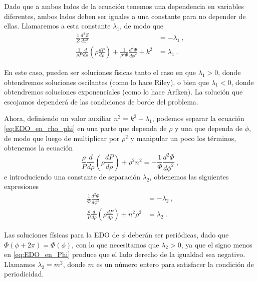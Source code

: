 Dado que a ambos lados de la ecuación tenemos una dependencia en variables diferentes, ambos lados deben ser iguales a una constante para no depender de ellas. Llamaremos a esta constante $\lambda_1$, de modo que
\begin{align}
    \frac{1}{Z} \frac{d^2Z}{dz^2} & = - \lambda_1 \ , \\
    \frac{1}{\rho P} \frac{d}{d\rho} \left( \rho \frac{dP}{d\rho} \right) + \frac{1}{\rho^2 \Phi} \frac{d^2 \Phi}{d\phi^2} + k^2 & = \lambda_1 \ . \label{eq:EDO_en_rho_phi}
\end{align}

En este caso, pueden ser soluciones físicas tanto el caso en que $\lambda_1>0$, donde obtendremos soluciones oscilantes (como lo hace Riley), o bien que $\lambda_1 < 0$, donde obtendremos soluciones exponenciales (como lo hace Arfken). La solución que escojamos dependerá de las condiciones de borde del problema.


Ahora, definiendo un valor auxiliar $n^2 = k^2 + \lambda_1$, podemos separar la ecuación \eqref{eq:EDO_en_rho_phi} en una parte que dependa de $\rho$ y una que dependa de $\phi$, de modo que luego de multiplicar por $\rho^2$ y manipular un poco los términos, obtenemos la ecuación
\begin{equation}
    \frac{\rho}{P} \frac{d}{d\rho} \left( \rho \frac{dP}{d\rho} \right) + \rho^2 n^2 = - \frac{1}{\Phi} \frac{d^2 \Phi}{d\phi^2} \ , 
\end{equation}
e introduciendo una constante de separación $\lambda_2$, obtenemos las siguientes expresiones
\begin{align}
    \frac{1}{\Phi} \frac{d^2 \Phi}{d\phi^2} & = - \lambda_2 \ , \label{eq:EDO_en_Phi} \\
    \frac{\rho}{P} \frac{d}{d\rho} \left( \rho \frac{dP}{d\rho} \right) + n^2 \rho^2 & = \lambda_2 \ .
\end{align}

Las soluciones físicas para la EDO de $\phi$ deberán ser periódicas, dado que $\Phi(\phi + 2\pi) = \Phi(\phi)$, con lo que necesitamos que $\lambda_2 > 0$, ya que el signo menos en \eqref{eq:EDO_en_Phi} produce que el lado derecho de la igualdad sea negativo. Llamamos $\lambda_2 = m^2$, donde $m$ es un número entero para satisfacer la condición de periodicidad.

